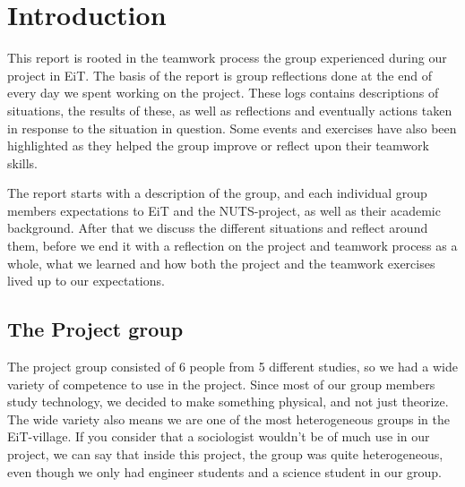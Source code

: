 \chapter{Introduction}
\label{chap:introduction}
This report is rooted in the teamwork process the group experienced during our project in EiT. The basis of the report is group reflections done at the end of every day we spent working on the project. These logs contains descriptions of situations, the results of these, as well as reflections and eventually actions taken in response to the situation in question. Some events and exercises have also been highlighted as they helped the group improve or reflect upon their teamwork skills.

The report starts with a description of the group, and each individual group members expectations to EiT and the NUTS-project, as well as their academic background. After that we discuss the different situations and reflect around them, before we end it with a reflection on the project and teamwork process as a whole, what we learned and how both the project and the teamwork exercises lived up to our expectations.
\section{The Project group}
The project group consisted of 6 people from 5 different studies, so we had a wide variety of competence to use in the project. Since most of our group members study technology, we decided to make something physical, and not just theorize. The wide variety also means we are one of the most heterogeneous groups in the EiT-village. If you consider that a sociologist wouldn't be of much use in our project, we can say that inside this project, the group was quite heterogeneous, even though we only had engineer students and a science student in our group. 

